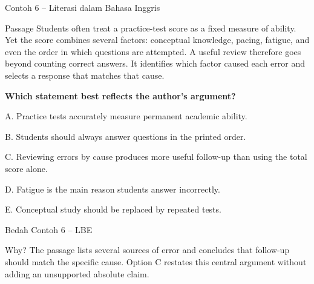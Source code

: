 \begin{frame}[shrink=10]{Contoh 6 -- Literasi dalam Bahasa Inggris}
  \begin{block}{Passage}
    \fontsize{9.8}{12.1}\selectfont Students often treat a practice-test score as a fixed measure of ability. Yet the score combines several factors: conceptual knowledge, pacing, fatigue, and even the order in which questions are attempted. A useful review therefore goes beyond counting correct answers. It identifies which factor caused each error and selects a response that matches that cause.
  \end{block}
  {\bfseries Which statement best reflects the author's argument?}\par
  \vspace{0.06cm}
  {\fontsize{9.0}{10.9}\selectfont
  A. Practice tests accurately measure permanent academic ability.\par\vspace{0.035cm}
  B. Students should always answer questions in the printed order.\par\vspace{0.035cm}
  C. Reviewing errors by cause produces more useful follow-up than using the total score alone.\par\vspace{0.035cm}
  D. Fatigue is the main reason students answer incorrectly.\par\vspace{0.035cm}
  E. Conceptual study should be replaced by repeated tests.}
\end{frame}

\begin{frame}{Bedah Contoh 6 -- LBE}
  \vspace{0.20cm}
  \begin{block}{Why?}
    The passage lists several sources of error and concludes that follow-up should match the specific cause. Option C restates this central argument without adding an unsupported absolute claim.
  \end{block}
  {\fontsize{10.6}{13.2}\selectfont
  \par\vspace{0.16cm}
  }
\end{frame}

